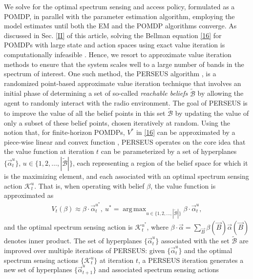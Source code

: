 \documentclass[10pt,twocolumn]{IEEEtran}
\DeclareMathOperator*{\argmax}{arg\,max}
\begin{document}
We solve for the optimal spectrum sensing and access policy, formulated as a POMDP, in parallel with the parameter estimation algorithm, employing the model estimates until both the EM and the POMDP algorithms converge. As discussed in Sec. \ref{II} of this article, solving the Bellman equation \eqref{16} for POMDPs with large state and action spaces using exact value iteration is computationally infeasible \cite{DBLP:journals/corr/abs-1109-2145}. Hence, we resort to approximate value iteration methods to ensure that the system scales well to a large number of bands in the spectrum of interest. One such method, the PERSEUS algorithm \cite{DBLP:journals/corr/abs-1109-2145}, is a randomized point-based approximate value iteration technique that involves an initial phase of determining a set of so-called \emph{reachable beliefs} $\tilde{\mathcal{B}}$ by allowing the agent to randomly interact with the radio environment. The goal of PERSEUS is to improve the value of all the belief points in this set $\tilde{\mathcal{B}}$ by updating the value of only a subset of these belief points, chosen iteratively at random. Using the notion that, for finite-horizon POMDPs, $V^*$ in \eqref{16} can be approximated by a piece-wise linear and convex function \cite{DBLP:journals/corr/abs-1109-2145}, PERSEUS operates on the core idea that the value function at iteration $t$ can be parameterized by a set of hyperplanes $\{\vec{\alpha}_{t}^{u}\}$, $u {\in} \{1,2,\dots,|\tilde{\mathcal{B}}|\}$, each representing a region of the belief space for which it is the maximizing element, and each associated with an optimal spectrum sensing action $\mathcal K_t^{u}$. That is, when operating with belief $\beta$, the value function is approximated as
\begin{equation}
    \begin{aligned}\label{40}
        V_{t}(\beta) \approx \beta \cdot \vec{\alpha}_{t}^{u^*},
        \ 
        u^* = \argmax_{u\in\{1,2,\dots,|\tilde{\mathcal{B}}|\}} \beta \cdot \vec{\alpha}_{t}^{u},
    \end{aligned}
\end{equation}
and the optimal spectrum sensing action is $\mathcal K_t^{u^*}$, where $\beta\cdot\vec{\alpha}{=}\sum_{\vec{B}}\beta(\vec{B})\vec{\alpha}(\vec{B})$ denotes inner product. The set of hyperplanes $\{\vec{\alpha}_{t}^{u}\}$ associated with the set $\tilde{\mathcal{B}}$ are improved over multiple iterations of PERSEUS: given $\{\vec{\alpha}_{t}^{u}\}$ and the optimal spectrum sensing actions $\{\mathcal K_{t}^{u}\}$ at iteration $t$, a PERSEUS iteration generates a new set of hyperplanes $\{\vec{\alpha}_{t+1}^{u}\}$ and associated spectrum sensing actions
\end{document}
